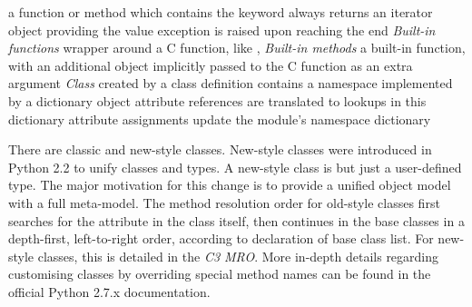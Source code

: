 \documentclass{icldt}
\numberwithin{equation}{section}       %
\begin{document}
{{\begin{enumerate}
			\subsubitem a function or method which contains the  keyword
			\subsubitem always returns an iterator object
			\subsubitem providing the  value
			\subsubitem {} exception is raised upon reaching the end
		\subitem \emph{Built-in functions}
			\subsubitem wrapper around a C function, like , 
		\subitem \emph{Built-in methods}
			\subsubitem a built-in function, with an additional object implicitly passed to the C function as an extra argument
		\subitem \emph{Class}
			\subsubitem created by a class definition
			\subsubitem contains a namespace implemented by a dictionary object
			\subsubitem attribute references are translated to lookups in this dictionary
			\subsubitem attribute assignments update the module's namespace dictionary

There are classic and new-style classes. New-style classes were introduced in Python 2.2 to unify classes and types. A new-style class is but just a user-defined type. The major motivation for this change is to provide a unified object model with a full meta-model. The method resolution order for old-style classes first searches for the attribute in the class itself, then continues in the base classes in a depth-first, left-to-right order, according to declaration of base class list. For new-style classes, this is detailed in the \emph{C3 MRO}. More in-depth details regarding customising classes by overriding special method names can be found in the official Python 2.7.x documentation.


\end{enumerate}}}
\end{document}
